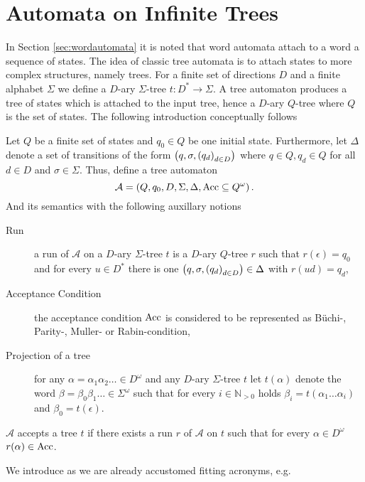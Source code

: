 \section{Automata on Infinite Trees}
In Section \ref{sec:wordautomata} it is noted that word automata attach to a
word a sequence of states. The idea of classic tree automata is to attach
states to more complex structures, namely trees. For a finite set of
directions $D$ and a finite alphabet $\Sigma$ we define a $D$-ary $\Sigma$-tree
$t:D^{*}\rightarrow\Sigma$. A tree automaton produces a tree of states
which is attached to the input tree, hence a $D$-ary $Q$-tree where $Q$ is the
set of states. The following introduction conceptually follows 
\cite[Chapter 8]{AutoLogInfGames}
\begin{definition}
  Let $Q$ be a finite set of states and $q_{0}\in Q$ be one initial state.
  Furthermore, let $\Delta$ denote a set of transitions of the form
  $\left(q,\sigma, \left(q_{d}\right)_{d\in D}\right)$ where $q\in Q, q_{d}\in Q$ for
  all $d\in D$ and $\sigma\in\Sigma$. Thus, define a tree automaton
  \begin{equation*}
    \mathcal{A} = \left(Q, q_{0}, D, \Sigma, \Delta, \operatorname{Acc}\subseteq Q^{\omega}\right).
  \end{equation*}
  And its semantics with the following auxillary notions
  \begin{description}
    \item[Run] a run of $\mathcal{A}$ on a $D$-ary $\Sigma$-tree $t$ is a
      $D$-ary $Q$-tree $r$ such that $r(\epsilon) = q_{0}$ and for every 
      $u\in D^{*}$ there is one 
      $\left(q,\sigma, \left(q_{d}\right)_{d\in D}\right)\in\Delta$ with $r(ud) = q_{d}$,
    \item[Acceptance Condition] the acceptance condition $\operatorname{Acc}$ is considered
      to be represented as Büchi-, Parity-, Muller- or Rabin-condition,
    \item[Projection of a tree] for any $\alpha=\alpha_{1}\alpha_{2}\dots\in
      D^{\omega}$ and any $D$-ary $\Sigma$-tree $t$ let $t(\alpha)$ denote the 
      word $\beta = \beta_{0}\beta_{1}\dots\in\Sigma^{\omega}$ such that for 
      every $i\in\mathbb{N}_{>0}$ holds 
      $\beta_{i} = t(\alpha_{1}\dots\alpha_{i})$ and $\beta_{0} = t(\epsilon)$.
  \end{description}
  $\mathcal{A}$ accepts a tree $t$ if there exists a run $r$ of $\mathcal{A}$
  on $t$ such that for every $\alpha\in D^{\omega}$ $r(\alpha)\in\operatorname{Acc}$.
\end{definition}
We introduce as we are already accustomed fitting acronyms, e.g.
